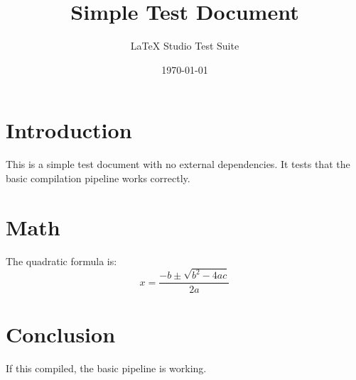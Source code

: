 \documentclass{article}
\title{Simple Test Document}
\author{LaTeX Studio Test Suite}
\date{\today}
\begin{document}
\maketitle

\section{Introduction}
This is a simple test document with no external dependencies.
It tests that the basic compilation pipeline works correctly.

\section{Math}
The quadratic formula is:
\[
x = \frac{-b \pm \sqrt{b^2 - 4ac}}{2a}
\]

\section{Conclusion}
If this compiled, the basic pipeline is working.
\end{document}
